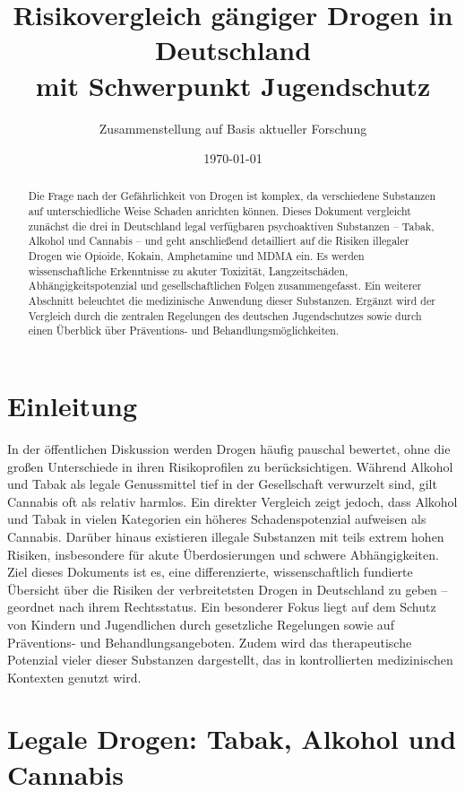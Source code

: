 \documentclass[11pt,a4paper]{article}
\title{Risikovergleich gängiger Drogen in Deutschland \\ mit Schwerpunkt Jugendschutz}
\author{Zusammenstellung auf Basis aktueller Forschung}
\date{\today}
\begin{document}
	
	\maketitle
	
	\begin{abstract}
		Die Frage nach der Gefährlichkeit von Drogen ist komplex, da verschiedene Substanzen auf unterschiedliche Weise Schaden anrichten können. Dieses Dokument vergleicht zunächst die drei in Deutschland legal verfügbaren psychoaktiven Substanzen – Tabak, Alkohol und Cannabis – und geht anschließend detailliert auf die Risiken illegaler Drogen wie Opioide, Kokain, Amphetamine und MDMA ein. Es werden wissenschaftliche Erkenntnisse zu akuter Toxizität, Langzeitschäden, Abhängigkeitspotenzial und gesellschaftlichen Folgen zusammengefasst. Ein weiterer Abschnitt beleuchtet die medizinische Anwendung dieser Substanzen. Ergänzt wird der Vergleich durch die zentralen Regelungen des deutschen Jugendschutzes sowie durch einen Überblick über Präventions- und Behandlungsmöglichkeiten.
	\end{abstract}
	
	\section{Einleitung}
	
	In der öffentlichen Diskussion werden Drogen häufig pauschal bewertet, ohne die großen Unterschiede in ihren Risikoprofilen zu berücksichtigen. Während Alkohol und Tabak als legale Genussmittel tief in der Gesellschaft verwurzelt sind, gilt Cannabis oft als relativ harmlos. Ein direkter Vergleich zeigt jedoch, dass Alkohol und Tabak in vielen Kategorien ein höheres Schadenspotenzial aufweisen als Cannabis. Darüber hinaus existieren illegale Substanzen mit teils extrem hohen Risiken, insbesondere für akute Überdosierungen und schwere Abhängigkeiten. Ziel dieses Dokuments ist es, eine differenzierte, wissenschaftlich fundierte Übersicht über die Risiken der verbreitetsten Drogen in Deutschland zu geben – geordnet nach ihrem Rechtsstatus. Ein besonderer Fokus liegt auf dem Schutz von Kindern und Jugendlichen durch gesetzliche Regelungen sowie auf Präventions- und Behandlungsangeboten. Zudem wird das therapeutische Potenzial vieler dieser Substanzen dargestellt, das in kontrollierten medizinischen Kontexten genutzt wird.
	
	\section{Legale Drogen: Tabak, Alkohol und Cannabis}
	
\end{document}
